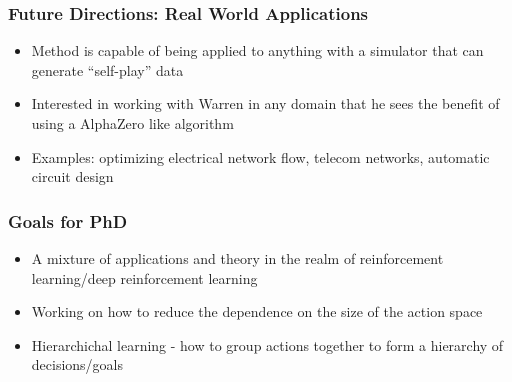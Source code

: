 \documentclass{beamer}
\begin{document}


\begin{frame}
  \frametitle{Future Directions: Real World Applications}

  \begin{itemize}
    \item Method is capable of being applied to anything with a simulator that can generate ``self-play'' data
    \item Interested in working with Warren in any domain that he sees the benefit of using a AlphaZero like algorithm
    \item Examples: optimizing electrical network flow, telecom networks, automatic circuit design
  \end{itemize}
\end{frame}



\begin{frame}
  \frametitle{Goals for PhD}

  \begin{itemize}
    \item A mixture of applications and theory in the realm of reinforcement learning/deep reinforcement learning
    \item Working on how to reduce the dependence on the size of the action space
    \item Hierarchichal learning - how to group actions together to form a hierarchy of decisions/goals
  \end{itemize}
\end{frame}


\end{document}
